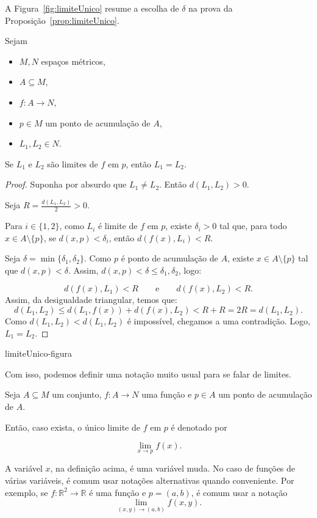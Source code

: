 A Figura~\ref{fig:limiteUnico} resume a escolha de $\delta$ na prova da Proposição~\ref{prop:limiteUnico}.

\begin{proposition}\label{prop:limiteUnico}
    Sejam
    \begin{itemize}
        \item $M, N$ espaços métricos,
        \item $A\subseteq M$,
        \item $f: A \to N$,
        \item $p \in M$ um ponto de acumulação de $A$,
        \item $L_1, L_2 \in N$.
    \end{itemize}

    Se $L_1$ e $L_2$ são limites de $f$ em $p$, então $L_1 = L_2$.
\end{proposition}

\begin{proof}
    Suponha por absurdo que $L_1\neq L_2$. Então $d(L_1, L_2) > 0$.

    Seja $R=\frac{d(L_1, L_2)}{2} > 0$.
    
    Para $i\in \{1, 2\}$, como $L_i$ é limite de $f$ em $p$, existe $\delta_i > 0$ tal que, para todo $x \in A\setminus\{p\}$, se $d(x, p) < \delta_i$, então $d(f(x), L_i) < R$.

    Seja $\delta = \min\{\delta_1, \delta_2\}$.
    Como $p$ é ponto de acumulação de $A$, existe $x \in A\setminus\{p\}$ tal que $d(x, p) < \delta$.
    Assim, $d(x, p)<\delta\leq \delta_1, \delta_2$, logo:

    \[
        d(f(x), L_1) < R \qquad\text{e}\qquad d(f(x), L_2) < R.
    \]
    Assim, da desigualdade triangular, temos que:
    \[
        d(L_1, L_2) \leq d(L_1, f(x)) + d(f(x), L_2) < R + R = 2R = d(L_1, L_2).
    \]
    Como $d(L_1, L_2) < d(L_1, L_2)$ é impossível, chegamos a uma contradição. Logo, $L_1 = L_2$.
\end{proof}


{limiteUnico-figura}

Com isso, podemos definir uma notação muito usual para se falar de limites.
\begin{definition}
    Seja $A\subseteq M$ um conjunto, $f: A \to N$ uma função e $p \in A$ um ponto de acumulação de $A$.

    Então, caso exista, o único limite de $f$ em $p$ é denotado por
    
    \[
    \lim_{x\to p} f(x).
    \]
\end{definition}
A variável $x$, na definição acima, é uma variável muda.
No caso de funções de várias variáveis, é comum usar notações alternativas quando conveniente.
Por exemplo, se $f:\mathbb R^2 \to \mathbb R$ é uma função e $p=(a, b)$, é comum usar a notação
\[
    \lim_{(x, y)\to (a, b)} f(x, y).
\]


